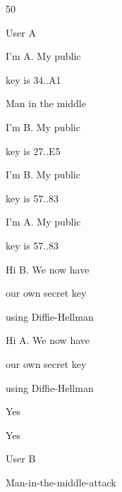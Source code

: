 \documentclass{article}
\begin{document}

50

User A

I'm A. My public

key is 34..A1

Man in the middle

I'm B. My public

key is 27..E5

I'm B. My public

key is 57..83

I'm A. My public

key is 57..83

Hi B. We now have

our own secret key

using Diffie-Hellman

Hi A. We now have

our own secret key

using Diffie-Hellman

Yes

Yes

User B

Man-in-the-middle-attack
\end{document}
